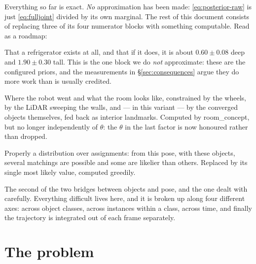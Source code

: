 \documentclass[11pt,a4paper]{report}
\newcommand{\given}{\,|\,}
\theoremstyle{definition}   %
\begin{document}
\noindent
Everything so far is exact. \emph{No} approximation has been made: \eqref{eq:posterior-raw} is
just \eqref{eq:fulljoint} divided by its own marginal. The rest of this document consists of
replacing three of its four numerator blocks with something computable. Read as a roadmap:

\begin{description}[style=nextline,leftmargin=1.4em,itemsep=9pt,parsep=2pt]

\item[\normalfont \ding{192}\ding{193}\; $P(e)\,P(\theta\given e)$ \;---\; \textbf{what objects are}]
That a refrigerator exists at all, and that if it does, it is about $0.60\pm0.08$ deep and
$1.90\pm0.30$ tall. This is the one block we do \emph{not} approximate: these are the configured
priors, and the measurements in \S\ref{sec:consequences} argue they do more work than is usually
credited.

\item[\normalfont \ding{194}--\ding{197}\; $P(R)P(X)P(\Phi\given X)P(L\given X,R,\theta)$ \;---\; \textbf{where the robot is}]
Where the robot went and what the room looks like, constrained by the wheels, by the LiDAR
sweeping the walls, and --- in this variant --- by the converged objects themselves, fed back as
interior landmarks. Computed by \textsf{room\_concept}, but no longer independently of $\theta$:
the $\theta$ in the last factor is now honoured rather than dropped.

\item[\normalfont \ding{198}\; $P(M\given\theta,e,X)$ \;---\; \textbf{whose mask is whose}]
Properly a distribution over assignments: from this pose, with these objects, several matchings
are possible and some are likelier than others. Replaced by its single most likely value,
computed greedily.

\item[\normalfont \ding{199}\; $P(Z\given\theta,M,X)$ \;---\; \textbf{how masks arise}]
The second of the two bridges between objects and pose, and the one dealt with carefully.
Everything difficult lives here, and it is broken up along four different axes: across object
classes, across instances within a class, across time, and finally the trajectory is integrated
out of each frame separately.

\end{description}

\section{The problem}
\label{sec:problem}
\end{document}
